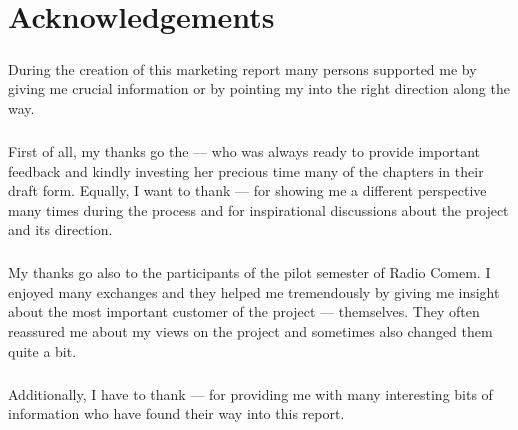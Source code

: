 
\thispagestyle{scrheadings}


\chapter*{Acknowledgements} %



\paragraph{}\noindent During the creation of this marketing report many persons supported me by giving me crucial information or by pointing my into the right direction along the way.

\paragraph{} First of all, my thanks go the --- who was always ready to provide important feedback and kindly investing her precious time many of the chapters in their draft form.
Equally, I want to thank --- for showing me a different perspective many times during the process and for inspirational discussions about the project and its direction.

\paragraph{}My thanks go also to the participants of the pilot semester of Radio Comem. I enjoyed many exchanges and they helped me tremendously by giving me insight about the most important customer of the project — themselves. They often reassured me about my views on the project and sometimes also changed them quite a bit.

\paragraph{}Additionally, I have to thank --- for providing me with many interesting bits of information who have found their way into this report.
